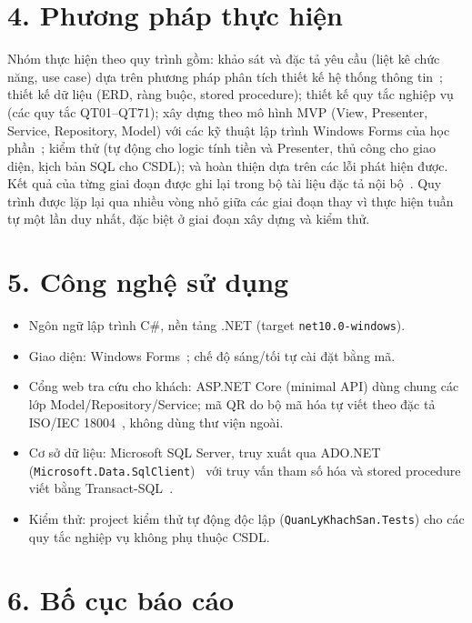 \documentclass[14pt]{report}
\begin{document}
\section*{4. Phương pháp thực hiện}

Nhóm thực hiện theo quy trình gồm: khảo sát và đặc tả yêu cầu (liệt kê chức năng, use case) dựa trên phương pháp phân tích thiết kế hệ thống thông tin~\cite{uit-ptt}; thiết kế dữ liệu (ERD, ràng buộc, stored procedure); thiết kế quy tắc nghiệp vụ (các quy tắc QT01--QT71); xây dựng theo mô hình MVP (View, Presenter, Service, Repository, Model) với các kỹ thuật lập trình Windows Forms của học phần~\cite{thoai}; kiểm thử (tự động cho logic tính tiền và Presenter, thủ công cho giao diện, kịch bản SQL cho CSDL); và hoàn thiện dựa trên các lỗi phát hiện được. Kết quả của từng giai đoạn được ghi lại trong bộ tài liệu đặc tả nội bộ~\cite{noibo}. Quy trình được lặp lại qua nhiều vòng nhỏ giữa các giai đoạn thay vì thực hiện tuần tự một lần duy nhất, đặc biệt ở giai đoạn xây dựng và kiểm thử.

\section*{5. Công nghệ sử dụng}

\begin{itemize}
  \item Ngôn ngữ lập trình C\#, nền tảng .NET (target \texttt{net10.0-windows}).
  \item Giao diện: Windows Forms~\cite{ms-winforms}; chế độ sáng/tối tự cài đặt bằng mã.
  \item Cổng web tra cứu cho khách: ASP.NET Core (minimal API) dùng chung các lớp Model/Repository/Service; mã QR do bộ mã hóa tự viết theo đặc tả ISO/IEC 18004~\cite{iso18004}, không dùng thư viện ngoài.
  \item Cơ sở dữ liệu: Microsoft SQL Server, truy xuất qua ADO.NET (\texttt{Microsoft.Data.SqlClient})~\cite{ms-sqlclient} với truy vấn tham số hóa và stored procedure viết bằng Transact-SQL~\cite{ms-tsql}.
  \item Kiểm thử: project kiểm thử tự động độc lập (\texttt{QuanLyKhachSan.Tests}) cho các quy tắc nghiệp vụ không phụ thuộc CSDL.
\end{itemize}

\section*{6. Bố cục báo cáo}
\end{document}
